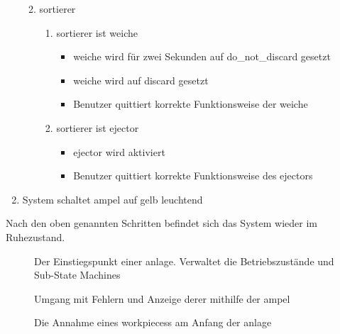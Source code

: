 \begin{enumerate}
\begin{enumerate}
\begin{itemize}
        \end{itemize}
        \item \Gls{sortierer}
        \begin{enumerate}
            \item \Gls{sortierer} ist \gls{weiche}
            \begin{itemize}
                \item \gls{weiche} wird für zwei Sekunden auf \gls{do_not_discard} gesetzt
                \item \gls{weiche} wird auf \gls{discard} gesetzt
                \item Benutzer quittiert korrekte Funktionsweise der \gls{weiche}
            \end{itemize}
            \item \gls{sortierer} ist \gls{ejector}
            \begin{itemize}
                \item \Gls{ejector} wird aktiviert
                \item Benutzer quittiert korrekte Funktionsweise des \gls{ejector}s
            \end{itemize}
        \end{enumerate}
    \end{enumerate}
    \item System schaltet \gls{ampel} auf gelb leuchtend
\end{enumerate}
Nach den oben genannten Schritten befindet sich das System wieder im Ruhezustand.


\begin{figure}
    \caption{Der Einstiegspunkt einer \gls{anlage}.
    Verwaltet die Betriebszustände und Sub-State Machines}
    \label{fig:stm_top_level}
\end{figure}

\begin{figure}
    \caption{Umgang mit Fehlern und Anzeige derer mithilfe der \gls{ampel}}
    \label{fig:stm_error}
\end{figure}

\begin{figure}
    \caption{Die Annahme eines \glspl{workpiece}s am Anfang der \gls{anlage}}
    \label{fig:stm_werkstueck_annahme}
\end{figure}

